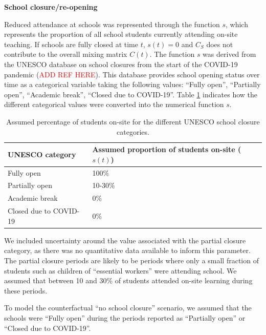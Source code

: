 \vspace{5pt}
\textbf{School closure/re-opening}

Reduced attendance at schools was represented through the function $s$, which represents the proportion of all school students 
currently attending on-site teaching. If schools are fully closed at time $t$, \(s(t)=0\) and \(C_{S}\) does not contribute to the overall 
mixing matrix \(C(t)\). 
The function $s$ was derived from the UNESCO database on school closures from the start of the COVID-19 pandemic (\textcolor{red}{ADD REF HERE}).
This database provides school opening status over time as a categorical variable taking the following values: ``Fully open'', ``Partially open'', ``Academic break'', ``Closed due to COVID-19''.
Table \ref{tab:unesco_categories} indicates how the different categorical values were converted into the numerical function $s$.

\vspace{5pt}
\begin{table}[ht]  
  \begin{center}
    \caption{Assumed percentage of students on-site for the different UNESCO school closure categories.}
    \label{tab:unesco_categories}
    \begin{tabular}{p{5cm} | p{5cm}}
          \hline
          \textbf{UNESCO category} & \textbf{Assumed proportion of students on-site ($s(t)$)} \\
          \hline
          Fully open & 100\% \\
          Partially open & 10-30\% \\
          Academic break & 0\% \\
          Closed due to COVID-19 & 0\% \\
          \hline
      \end{tabular}
    \end{center}
  \end{table}

We included uncertainty around the value associated with the partial closure category, as there was no quantitative data available to 
inform this parameter. The partial closure periods are likely to be periods where only a small fraction of students such as children of ``essential workers'' were 
attending school. We assumed that between 10 and 30\% of students attended on-site learning during these periods.

To model the counterfactual ``no school closure'' scenario, we assumed that the schools were ``Fully open'' during the
periods reported as ``Partially open'' or ``Closed due to COVID-19''.

